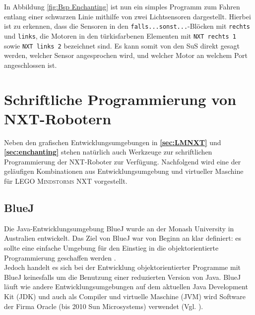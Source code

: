 \documentclass[paper=a4, pagesize, DIV=calc, BCOR=15.5mm, twoside=on, onecolumn=on, open = right, titlepage =on, parskip =half-, headsepline = on, footsepline = on, chapterprefix = on, appendixprefix = off, fontsize = 12pt, numbers = noenddot, abstract = on]{scrbook}
\numberwithin{equation}{chapter}
\theoremstyle{definition}
\theoremstyle{plain}
\theoremstyle{plain}
\theoremstyle{remark}
\theoremstyle{plain}
\theoremstyle{plain}
\begin{document}
In Abbildung \ref{fig:Bsp Enchanting} ist nun ein simples Programm zum Fahren entlang einer schwarzen Linie mithilfe von zwei Lichtsensoren dargestellt. Hierbei ist zu erkennen, dass die Sensoren in den \texttt{falls...sonst...}-Blöcken mit \texttt{rechts} und \texttt{links}, die Motoren in den türkisfarbenen Elementen mit \texttt{NXT rechts 1} sowie \texttt{NXT links 2} bezeichnet sind. Es kann somit von den SuS direkt gesagt werden, welcher Sensor angesprochen wird, und welcher Motor an welchem Port angeschlossen ist.

\section{Schriftliche Programmierung von NXT-Robotern}
\label{sec:bluejetc}
Neben den grafischen Entwicklungsumgebungen in \textbf{\ref{sec:LMNXT}} und \textbf{\ref{sec:enchanting}} stehen natürlich auch Werkzeuge zur schriftlichen Programmierung der NXT-Roboter zur Verfügung. Nachfolgend wird eine der geläufigen Kombinationen aus Entwicklungsumgebung und virtueller Maschine für \textsc{LEGO Mindstorms} NXT vorgestellt. 

\subsection{BlueJ}
\label{sec:bluej}
Die Java-Entwicklungsumgebung BlueJ wurde an der Monash University in Australien entwickelt. Das Ziel von BlueJ war von Beginn an klar definiert: es sollte eine einfache Umgebung für den Einstieg in die objektorientierte Programmierung geschaffen werden \cite[S.14]{barnes:03}.\\
Jedoch handelt es sich bei der Entwicklung objektorientierter Programme mit BlueJ keinesfalls um die Benutzung einer reduzierten Version von Java. BlueJ läuft wie andere Entwicklungsumgebungen auf dem aktuellen Java Development Kit (JDK) und auch als Compiler und virtuelle Maschine (JVM) wird Software der Firma Oracle (bis 2010 Sun Microsystems) verwendet (Vgl. \cite[S.15]{barnes:03}).
\end{document}
